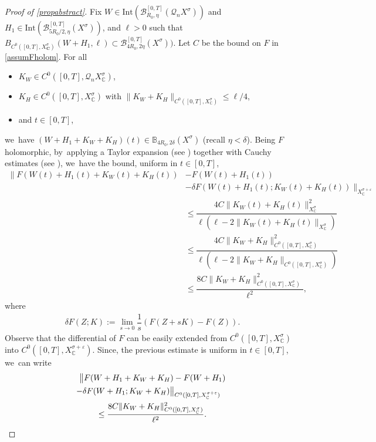 \documentclass[10pt]{amsart}
\theoremstyle{definition}
\let\mc\mathcal
\let\veps\varepsilon
\newcommand{\B}{\mc{B}}
\newcommand{\C}{\boldsymbol{C}}
\newcommand{\Q}{\mathcal{Q}}
\providecommand{\norm}[1]{\lVert#1\rVert}
\begin{document}
\begin{proof}[Proof of \cref{propabstract}]
Fix $W\in \text{Int}(\B_{R_0, \eta}^{[0, T]}(\Q_nX^\sigma))$ and $H_1\in \text{Int}(\B_{5R_0/2, \eta}^{[0, T]}(X^\sigma))$, and $\ell>0$ such that $B_{C^0([0,T],X_{\C}^\sigma)}(W+H_1,\ell)\subset \B_{4R_0, 2\eta}^{[0, T]}(X^\sigma))$. Let $C$ be the bound on $F$ in \cref{assumFholom}. For all
\begin{itemize}
\item
$K_W\in C^0([0, T], \Q_n X_\mathbb{C}^\sigma)$,
\item
$K_H\in C^0([0, T], X_\mathbb{C}^\sigma)$ with $\norm{K_W+K_H}_{C^0([0, T], X_\mathbb{C}^\sigma)}\leq \ell/4$,
\item
and $t\in [0,T]$,
\end{itemize}
we~have $(W+H_1+K_W+K_H)(t) \in \mathbb{B}_{4R_{0},2\delta}(X^{\sigma})$ (recall $\eta<\delta$). Being $F$ holomorphic, by~applying a Taylor expansion (see \cite[Th.\,7.1, Cor.\,7.3]{Muj86}) together with Cauchy estimates (see \cite[Cor.\,7.4]{Muj86}), we~have the bound, uniform in $t\in [0,T]$,
\begin{align*}
\lVert F(W(t)+H_1(t)+K_W(t)+K_H(t))&-F(W(t)+H_1(t))\\
&-\delta F(W(t)+H_1(t); K_W(t)+K_H(t)) \rVert_{ X_\mathbb{C}^{\sigma+\veps}}\\
&\leq \dfrac{4C\norm{K_W(t)+K_H(t)}_{X_\mathbb{C}^\sigma}^2}{\ell(\ell-2\norm{K_W(t)+K_H(t)}_{X_\mathbb{C}^\sigma})} \\
&\leq \dfrac{4C\norm{K_W+K_H}_{C^0([0, T], X_\mathbb{C}^\sigma)}^2}{\ell(\ell-2\norm{K_W+K_H}_{C^0([0, T], X_\mathbb{C}^\sigma)})}\\
&\leq \dfrac{8C\norm{K_W+K_H}_{C^0([0, T], X_\mathbb{C}^\sigma)}^2}{\ell^2},
\end{align*}
where
\begin{align*}
\delta F(Z; K):=\lim_{s\to 0}\dfrac{1}{s}(F(Z+sK)-F(Z)).
\end{align*}
Observe that the differential of $F$ can be easily extended from $C^0([0, T], X_\mathbb{C}^\sigma)$ into $C^0([0, T], X_\mathbb{C}^{\sigma+\veps})$. Since, the previous estimate is uniform in $t\in [0,T]$, we~can write
\begin{multline}
\bigl\Vert F(W+H_1+K_W+K_H)-F(W+H_1)\\
\shoveright{-\delta F(W+H_1; K_W+K_H)\bigr\Vert_{C^0([0, T], X_\mathbb{C}^{\sigma+\veps})}}\\
\leq \dfrac{8C\norm{K_W+K_H}_{C^0([0, T], X_\mathbb{C}^\sigma)}^2}{\ell^2}.\label{prop:proof:frechet-1}
\end{multline}


\end{proof}
\end{document}
